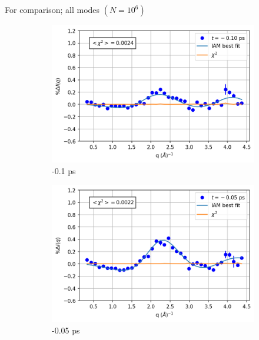 \documentclass{beamer}
\newcommand\w{0.32}
\begin{document}
\begin{frame}{For comparison; all modes $(N= 10^6)$}
	\begin{figure}
		\centering
		\begin{subfigure}[b]{\w\textwidth}
			\centering
			\includegraphics[width=\textwidth]{figures/1000000_allmodes_-0.10.png}
			\caption{-0.1 ps}
		\end{subfigure}
		\begin{subfigure}[b]{\w\textwidth}
			\centering
			\includegraphics[width=\textwidth]{figures/1000000_allmodes_-0.05.png}
			\caption{-0.05 ps}
		\end{subfigure}
		\begin{subfigure}[b]{\w\textwidth}
			\centering

\end{subfigure}
\end{figure}
\end{frame}
\end{document}
